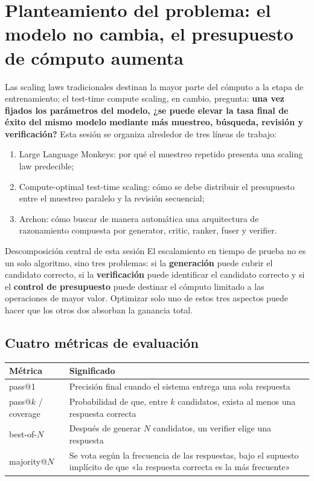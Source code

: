 \documentclass[a4paper]{article}
\begin{document}
\makelecturetitle

\section{Planteamiento del problema: el modelo no cambia, el presupuesto de cómputo aumenta}

Las scaling laws tradicionales destinan la mayor parte del cómputo a la etapa de entrenamiento; el test-time compute scaling, en cambio, pregunta: \textbf{una vez fijados los parámetros del modelo, ¿se puede elevar la tasa final de éxito del mismo modelo mediante más muestreo, búsqueda, revisión y verificación?} Esta sesión se organiza alrededor de tres líneas de trabajo:

\begin{enumerate}
    \item Large Language Monkeys: por qué el muestreo repetido presenta una scaling law predecible;
    \item Compute-optimal test-time scaling: cómo se debe distribuir el presupuesto entre el muestreo paralelo y la revisión secuencial;
    \item Archon: cómo buscar de manera automática una arquitectura de razonamiento compuesta por generator, critic, ranker, fuser y verifier.
\end{enumerate}

\begin{importantbox}{Descomposición central de esta sesión}
El escalamiento en tiempo de prueba no es un solo algoritmo, sino tres problemas: si la \textbf{generación} puede cubrir el candidato correcto, si la \textbf{verificación} puede identificar el candidato correcto y si el \textbf{control de presupuesto} puede destinar el cómputo limitado a las operaciones de mayor valor. Optimizar solo uno de estos tres aspectos puede hacer que los otros dos absorban la ganancia total.
\end{importantbox}

\subsection{Cuatro métricas de evaluación}

\begin{table}[H]
\centering
\begin{tabular}{p{3.1cm}p{10.5cm}}
\toprule
\textbf{Métrica} & \textbf{Significado} \\
\midrule
pass@1 & Precisión final cuando el sistema entrega una sola respuesta \\
pass@$k$ / coverage & Probabilidad de que, entre $k$ candidatos, exista al menos una respuesta correcta \\
best-of-$N$ & Después de generar $N$ candidatos, un verifier elige una respuesta \\
majority@$N$ & Se vota según la frecuencia de las respuestas, bajo el supuesto implícito de que «la respuesta correcta es la más frecuente» \\
\bottomrule
\end{tabular}
\end{table}
\end{document}
